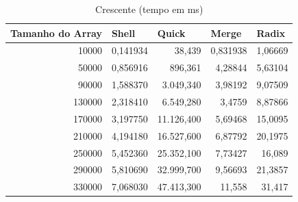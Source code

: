 \documentclass[a4paper, 12pt]{article}
\begin{document}
\begin{longtable}[c]{@{}rrrrr@{}}
	\caption{Crescente (tempo em ms)}
	\label{tab:crescente2-table}\\
	\toprule
	\multicolumn{1}{l}{\textbf{Tamanho do Array}} & \multicolumn{1}{l}{\textbf{Shell}} & \multicolumn{1}{l}{\textbf{Quick}} & \multicolumn{1}{l}{\textbf{Merge}} & \multicolumn{1}{l}{\textbf{Radix}} \\* \midrule
	\endfirsthead
	\endhead
	\multicolumn{1}{|r|}{10000}                   & \multicolumn{1}{r|}{0,141934}      & \multicolumn{1}{r|}{38,439}        & \multicolumn{1}{r|}{0,831938}      & \multicolumn{1}{r|}{1,06669}       \\* \midrule
	\multicolumn{1}{|r|}{50000}                   & \multicolumn{1}{r|}{0,856916}      & \multicolumn{1}{r|}{896,361}       & \multicolumn{1}{r|}{4,28844}       & \multicolumn{1}{r|}{5,63104}       \\* \midrule
	\multicolumn{1}{|r|}{90000}                   & \multicolumn{1}{r|}{1,588370}      & \multicolumn{1}{r|}{3.049,340}     & \multicolumn{1}{r|}{3,98192}       & \multicolumn{1}{r|}{9,07509}       \\* \midrule
	\multicolumn{1}{|r|}{130000}                  & \multicolumn{1}{r|}{2,318410}      & \multicolumn{1}{r|}{6.549,280}     & \multicolumn{1}{r|}{3,4759}        & \multicolumn{1}{r|}{8,87866}       \\* \midrule
	\multicolumn{1}{|r|}{170000}                  & \multicolumn{1}{r|}{3,197750}      & \multicolumn{1}{r|}{11.126,400}    & \multicolumn{1}{r|}{5,69468}       & \multicolumn{1}{r|}{15,0095}       \\* \midrule
	\multicolumn{1}{|r|}{210000}                  & \multicolumn{1}{r|}{4,194180}      & \multicolumn{1}{r|}{16.527,600}    & \multicolumn{1}{r|}{6,87792}       & \multicolumn{1}{r|}{20,1975}       \\* \midrule
	\multicolumn{1}{|r|}{250000}                  & \multicolumn{1}{r|}{5,452360}      & \multicolumn{1}{r|}{25.352,100}    & \multicolumn{1}{r|}{7,73427}       & \multicolumn{1}{r|}{16,089}        \\* \midrule
	\multicolumn{1}{|r|}{290000}                  & \multicolumn{1}{r|}{5,810690}      & \multicolumn{1}{r|}{32.999,700}    & \multicolumn{1}{r|}{9,56693}       & \multicolumn{1}{r|}{21,3857}       \\* \midrule
	\multicolumn{1}{|r|}{330000}                  & \multicolumn{1}{r|}{7,068030}      & \multicolumn{1}{r|}{47.413,300}    & \multicolumn{1}{r|}{11,558}        & \multicolumn{1}{r|}{31,417}        \\* \midrule

\end{longtable}
\end{document}
